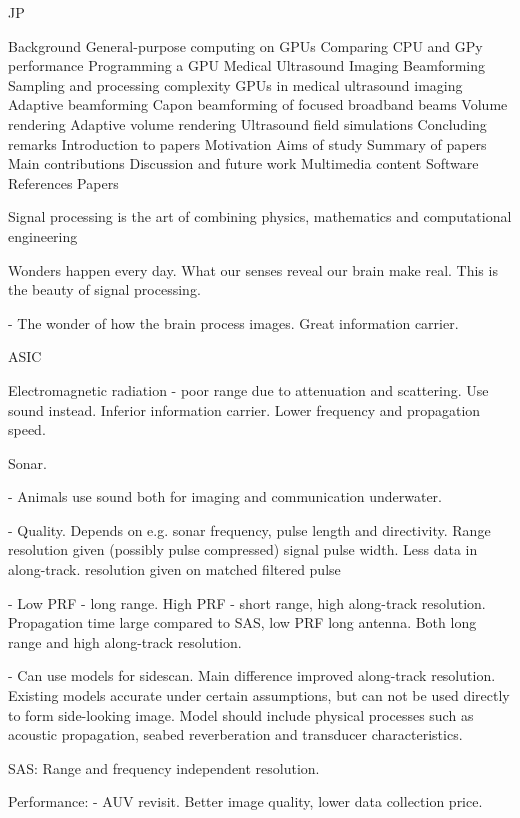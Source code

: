    
JP

Background
   General-purpose computing on GPUs
      Comparing CPU and GPy performance
      Programming a GPU
   Medical Ultrasound Imaging
      Beamforming
      Sampling and processing complexity
      GPUs in medical ultrasound imaging
      Adaptive beamforming
      Capon beamforming of focused broadband beams
   Volume rendering
      Adaptive volume rendering
   Ultrasound field simulations
   Concluding remarks
Introduction to papers
   Motivation
   Aims of study
   Summary of papers
   Main contributions
   Discussion and future work
   Multimedia content
   Software
References
Papers


Signal processing is the art of combining physics, mathematics and computational engineering 

Wonders happen every day. What our senses reveal our brain make real. This is the beauty of signal processing.

- The wonder of how the brain process images. Great information carrier.

\gls{ASIC}

Electromagnetic radiation - poor range due to attenuation and scattering. Use sound instead. Inferior information carrier. Lower frequency and propagation speed.

Sonar. 

- Animals use sound both for imaging and communication underwater.

- Quality. Depends on e.g. sonar frequency, pulse length and directivity. Range resolution given (possibly pulse compressed) signal pulse width. Less data in along-track. resolution given on matched filtered pulse 

- Low PRF - long range. High PRF - short range, high along-track resolution. Propagation time large compared to  SAS, low PRF long antenna. Both long range and high along-track resolution.

- Can use models for sidescan. Main difference improved along-track resolution. Existing models accurate under certain assumptions, but can not be used directly to form side-looking image. Model should include physical processes such as acoustic propagation, seabed reverberation and transducer characteristics.

SAS: Range and frequency independent resolution.


Performance:
- AUV revisit. Better image quality, lower data collection price.

